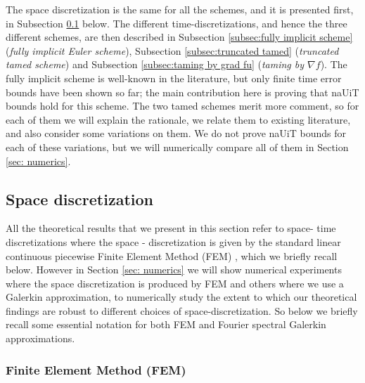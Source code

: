\documentclass[reqno, 11pt]{amsart}
\theoremstyle{plain}
\theoremstyle{definition}
\theoremstyle{remark}
\numberwithin{equation}{section}
\numberwithin{theorem}{section}
\begin{document}
{The space discretization is the same for all the schemes, and it is presented first, in Subsection \ref{subsec:space discretization} below. The different time-discretizations, and hence the three different schemes, are then described in Subsection \ref{subsec:fully implicit scheme} ({\em fully implicit Euler scheme}), Subsection \ref{subsec:truncated tamed} ({\em truncated tamed scheme}) and Subsection \ref{subsec:taming by grad fu} ({\em taming by $\nabla f$}). The fully implicit scheme is well-known in the literature, but only finite time error bounds have been shown so far;  the main contribution here is proving that naUiT bounds hold for this scheme. 
The two tamed schemes merit more comment, so for each of them we will explain the  rationale, we relate them to existing literature, and also consider some variations on them. We do not prove naUiT bounds for each of these variations, but we will numerically compare all of them in Section \ref{sec: numerics}.   


\subsection{Space discretization}\label{subsec:space discretization} 
All the theoretical results that we present in this section refer to space- time discretizations where the space - discretization is given by the 
standard linear continuous piecewise Finite Element Method (FEM) \cite{Brenner, QuarteroniV97}, which we briefly recall below.  However in Section \ref{sec: numerics} we will show numerical experiments where the space discretization is produced by FEM and others where we use a Galerkin approximation, to numerically study the extent to which our theoretical findings are robust to different choices of space-discretization.  So below we briefly recall some essential notation for both FEM and Fourier spectral Galerkin approximations.  

\subsubsection{Finite Element Method (FEM)}
\label{s:fem}


}
\end{document}

